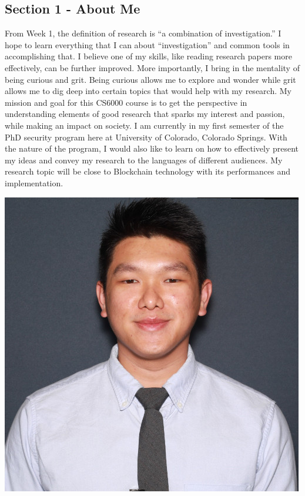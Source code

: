 \subsection{Section 1 - About Me}

From Week 1, the definition of research is “a combination of investigation.” I hope to learn everything that I can about “investigation” and common tools in accomplishing that. I believe one of my skills, like reading research papers more effectively, can be further improved. More importantly, I bring in the mentality of being curious and grit. Being curious allows me to explore and wonder while grit allows me to dig deep into certain topics that would help with my research. My mission and goal for this CS6000 course is to get the perspective in understanding elements of good research that sparks my interest and passion, while making an impact on society. I am currently in my first semester of the PhD security program here at University of Colorado, Colorado Springs. With the nature of the program, I would also like to learn on how to effectively present my ideas and convey my research to the languages of different audiences. My research topic will be close to Blockchain technology with its performances and implementation. 

\begin{center}
\includegraphics[scale=0.45]{kl.png}
\end{center}

